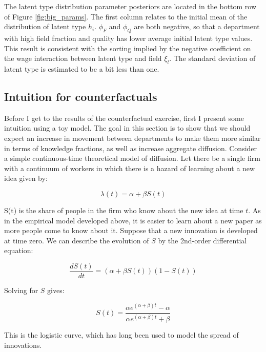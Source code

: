 The latent type distribution parameter posteriors are located in the bottom
row of Figure \ref{fig:big_params}. The first column relates to the initial
mean of the distribution of latent type $h_i$. $\phi_F$ and $\phi_Q$ are both negative, so that
a department with high field fraction and quality has lower average initial latent type values.  This result is consistent with
the sorting implied by the negative coefficient on the wage interaction between latent type and field $\xi_l$.
The standard deviation of latent type is estimated to be a bit less than one.

\subsection{Intuition for counterfactuals}
\label{sec:count_int}

Before I get to the results of the counterfactual exercise, first I present some
intuition using a toy model.  The goal in this section is to show that we should expect
an increase in movement between departments to make them more similar in terms of knowledge fractions,
as well as increase aggregate diffusion.  Consider a simple continuous-time theoretical model of
diffusion. Let there be a single firm with a continuum of workers in
which there is a hazard of learning about a new idea given by:

\begin{equation}
    \lambda(t) = \alpha + \beta S(t)
\end{equation}

S(t) is the share of people in the firm who know about the new idea at
time $t$. As in the empirical model
developed above, it is easier to learn about a new paper as
more people come to know about it. Suppose that a new innovation is developed at time
zero. We can describe the evolution of $S$ by the 2nd-order differential
equation:

\begin{equation}
    \frac{dS(t)}{d t} = \left( \alpha + \beta S(t) \right) \left(1 - S(t)\right)
    \label{eq:difeq_orig}
\end{equation}

Solving for $S$ gives:

\begin{equation}
    S(t) = \frac{\alpha e^{\left(\alpha + \beta \right) t} - \alpha}{\alpha e^{\left(\alpha + \beta \right) t} + \beta}
    \label{eq:difeq}
\end{equation}

This is the logistic curve, which has long been used to model the spread
of innovations.

